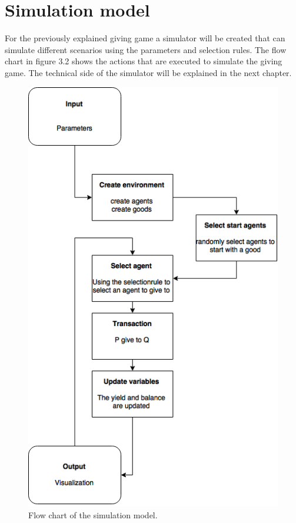 \documentclass[twoside,openright]{uva-bachelor-thesis}
\begin{document}
\section{Simulation model}
For the previously explained giving game a simulator will be created that can simulate different scenarios using the parameters and selection rules. The flow chart in figure 3.2 shows the actions that are executed to simulate the giving game. The technical side of the simulator will be explained in the next chapter. 
\begin{figure}[h!]
    \centering
    \includegraphics[scale=0.6]{FlowChart/FlowChart}
\caption{Flow chart of the simulation model.}
\end{figure}
\end{document}
